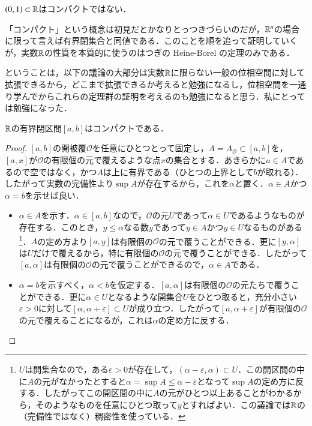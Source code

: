 \begin{que}
$(0,1) \subset \mathbb{R}$はコンパクトではない．
\end{que}

「コンパクト」という概念は初見だとかなりとっつきづらいのだが，$\mathbb{R}^n$の場合に限って言えば有界閉集合と同値である．このことを順を追って証明していくが，実数$\mathbb{R}$の性質を本質的に使うのはつぎの Heine-Borel の定理のみである．

\begin{que}[*]
ということは，以下の議論の大部分は実数$\mathbb{R}$に限らない一般の位相空間に対して拡張できるから，どこまで拡張できるか考えると勉強になるし，位相空間を一通り学んでからこれらの定理群の証明を考えるのも勉強になると思う．私にとっては勉強になった．
\end{que}

\begin{thm}
$\mathbb{R}$の有界閉区間$[a,b]$はコンパクトである．
\end{thm}

\begin{proof}
$[a,b]$の開被覆$\mathscr{O}$を任意にひとつとって固定し，$A = A_{\mathscr{O}} \subset[a,b]$を，$[a,x]$が$\mathscr{O}$の有限個の元で覆えるような点$x$の集合とする．あきらかに$a \in A$であるので空ではなく，かつ$A$は上に有界である（ひとつの上界として$b$が取れる）．したがって実数の完備性より$\sup A$が存在するから，これを$\alpha$と置く．$\alpha \in A$かつ$\alpha = b$を示せば良い．
\begin{itemize}
\item $\alpha \in A$を示す．$\alpha \in [a,b]$なので，$\mathscr{O}$の元$U$であって$\alpha \in U$であるようなものが存在する．このとき，$y \leq \alpha$なる数$y$であって$y \in A$かつ$y \in U$なるものがある\footnote{$U$は開集合なので，ある$\varepsilon > 0$が存在して，$(\alpha - \varepsilon, \alpha) \subset U$．この開区間の中に$A$の元がなかったとすると$\alpha = \sup A \leq \alpha - \varepsilon$となって$\sup A$の定め方に反する．したがってこの開区間の中に$A$の元がひとつ以上あることがわかるから，そのようなものを任意にひとつ取って$y$とすればよい．この議論では$\mathbb{R}$の（完備性ではなく）稠密性を使っている．}．$A$の定め方より$[a,y]$は有限個の$\mathscr{O}$の元で覆うことができる．更に$[y,\alpha]$は$U$だけで覆えるから，特に有限個の$\mathscr{O}$の元で覆うことができる．したがって$[a,\alpha]$は有限個の$\mathscr{O}$の元で覆うことができるので，$\alpha \in A$である．
\item $\alpha = b$を示すべく，$\alpha < b$を仮定する．$[a,\alpha]$は有限個の$\mathscr{O}$の元たちで覆うことができる．更に$\alpha \in U$となるような開集合$U$をひとつ取ると，充分小さい$\varepsilon > 0$に対して$[\alpha, \alpha + \varepsilon] \subset U$が成り立つ．したがって$[a, \alpha + \varepsilon]$が有限個の$\mathscr{O}$の元で覆えることになるが，これは$\alpha$の定め方に反する．
\end{itemize}
\end{proof}


